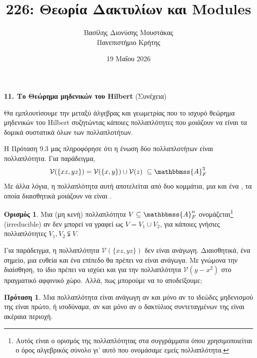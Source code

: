 \documentclass[12pt,a4paper,reqno]{amsart}
\title{226: Θεωρία Δακτυλίων και Modules}
\author[Β.~Δ. Μουστακας]{Βασίλης Διονύσης Μουστάκας \\ Πανεπιστήμιο Κρήτης}
\date{19 Μαΐου 2026}
\theoremstyle{definition}
\newtheorem{proposition}[theorem]{Πρόταση}
\newtheorem{definition}[theorem]{Ορισμός}
\theoremstyle{remark}
\numberwithin{theorem}{section}
\numberwithin{exercise}{section}
\numberwithin{equation}{section}
\renewcommand{\AA}{\mathbbmss{A}}
\newcommand{\vV}{\mathcal{V}}
\newcommand{\defn}[1]{{\color{mylightblue}{#1}}}
\begin{document}
\begingroup
\def\uppercasenonmath#1{} %
\let\MakeUppercase\relax %
\maketitle
\endgroup

\setcounter{section}{11}
\setcounter{theorem}{4}
\setcounter{equation}{2}
\begin{center}
    \textbf{11. Το Θεώρημα μηδενικών του Hilbert
} (Συνέχεια)
\end{center}

Θα εμπλουτίσουμε την  μεταξύ άλγεβρας και γεωμετρίας που  το ισχυρό θεώρημα μηδενικών του Hilbert συζητώντας κάποιες πολλαπλότητες που μοιάζουν να είναι τα δομικά συστατικά όλων των πολλαπλοτήτων.
  
Η Πρόταση 9.3 μας πληροφόρησε ότι η ένωση δύο πολλαπλοτήτων είναι πολλαπλότητα. Για παράδειγμα, 
\[
\vV(\{xz, yz\}) = \vV(\{x, y\}) \cup \vV(z) \ \subseteq \AA_F^3
\]
Με άλλα λόγια, η πολλαπλότητα αυτή αποτελείται από δυο κομμάτια, μια  και ένα , τα οποία διαισθητικά μοιάζουν να είναι .

\begin{definition}
  \label{def:variety_irreducible}
  Μια (μη κενή) πολλαπλότητα $V \subseteq \AA_F^n$ ονομάζεται\footnote{Αυτός είναι ο ορισμός της πολλαπλότητας στα συγγράμματα όπου χρησιμοποιείται ο όρος αλγεβρικός σύνολο γι' αυτό που ονομάσαμε εμείς πολλαπλότητα.} \defn{ανάγωγη} (irreducible) αν δεν μπορεί να γραφεί ως $V = V_1 \cup V_2$, για κάποιες γνήσιες πολλαπλότητες $V_1, V_2 \subsetneqq V$.
\end{definition}

Για παράδειγμα, η πολλαπλότητα $\vV(\{xz, yz\})$ δεν είναι ανάγωγη. Διαισθητικά, ένα ση\-μείο, μια ευθεία και ένα επίπεδο θα πρέπει να είναι ανάγωγα. Με γνώμονα την διαίσθηση, το ίδιο πρέπει να ισχύει και για την πολλαπλότητα $\vV(y-x^2)$ στο πραγματικό αφφινικό χώρο. Αλλά, πως μπορούμε να το αποδείξουμε;

\begin{proposition}
  \label{prop:prime_irreducible}
  Μια πολλαπλότητα είναι ανάγωγη αν και μόνο αν το ιδεώδες μηδενισμού της είναι πρώτο, ή ισοδύναμα, αν και μόνο αν ο δακτύλιος συντεταγμένων της είναι ακέραια περιοχή.
\end{proposition}
\end{document}
